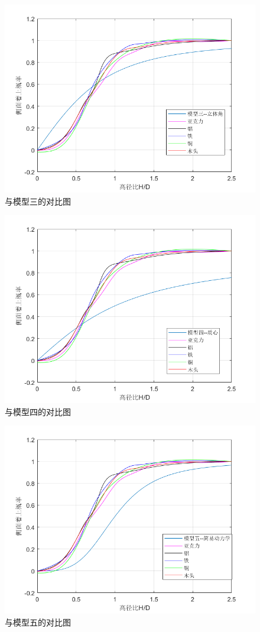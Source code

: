 \documentclass[UTF8]{gapd}
\begin{document}
\begin{figure}[H]%
	\centering
	\includegraphics[width=1\columnwidth]{images/比较3}
	\caption{与模型三的对比图}
	\label{fig:P2}%
\end{figure}
\begin{figure}[H]%
	\centering
	\includegraphics[width=1\columnwidth]{images/比较4}
	\caption{与模型四的对比图}
	\label{fig:P2}%
\end{figure}
\begin{figure}[H]%
	\centering
	\includegraphics[width=1\columnwidth]{images/比较5}
	\caption{与模型五的对比图}
	\label{fig:P2}%
\end{figure}
\end{document}
